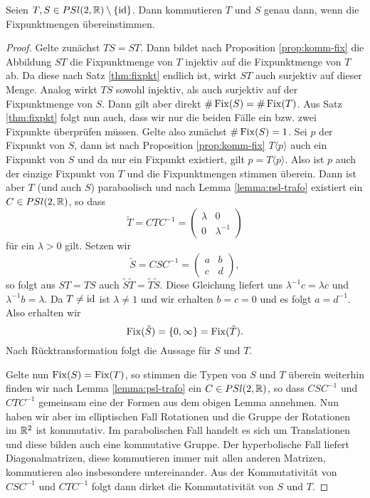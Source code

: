 \begin{thm}
  \label{thm:komm-fix}
  Seien $T,S \in PSl(2, \mathbb{R})\setminus \{\operatorname{id}\}$. Dann kommutieren $T$ und $S$ genau dann,
  wenn die Fixpunktmengen übereinstimmen.
\end{thm}

\begin{proof}
  Gelte zunächst $TS = ST$. Dann bildet nach Proposition
  \ref{prop:komm-fix} die Abbildung $ST$ die Fixpunktmenge von $T$
  injektiv auf die Fixpunktmenge von $T$ ab. Da diese nach Satz
  \ref{thm:fixpkt} endlich ist, wirkt $ST$ auch surjektiv auf dieser
  Menge. Analog wirkt $TS$ sowohl injektiv, als auch surjektiv auf der
  Fixpunktmenge von $S$. Dann gilt aber direkt $\# \operatorname{Fix}(S) = \#
  \operatorname{Fix}(T)$. Aus Satz \ref{thm:fixpkt} folgt nun auch, dass wir nur die
  beiden Fälle ein bzw. zwei Fixpunkte überprüfen müssen. Gelte also
  zunächst $\# \operatorname{Fix}(S) = 1$. Sei $p$ der Fixpunkt von $S$, dann ist
  nach Proposition \ref{prop:komm-fix} $T\langle p \rangle$ auch ein
  Fixpunkt von $S$ und da nur ein Fixpunkt existiert, gilt $ p = T
  \langle p \rangle$. Also ist $p$ auch der einzige Fixpunkt von $T$
  und die Fixpunktmengen stimmen überein. Dann ist aber $T$ (und auch
  $S$) parabaolisch und nach Lemma \ref{lemma:psl-trafo} existiert ein
  $C \in PSl(2,\mathbb{R})$, so dass
  \[
  \tilde T = C T C^{-1} =
  \begin{pmatrix}
    \lambda & 0 \\
    0 & \lambda^{-1}
  \end{pmatrix}
  \]
  für ein $\lambda > 0$ gilt. Setzen wir
  \[
  \tilde S = C S C^{-1} =
  \begin{pmatrix}
    a & b \\
    c & d
  \end{pmatrix},
  \]
  so folgt aus $ST = TS$ auch $\tilde S \tilde T = \tilde T \tilde
  S$. Diese Gleichung liefert uns $\lambda^{-1} c = \lambda c$ und
  $\lambda^{-1} b = \lambda$. Da $T \neq \operatorname{id}$ ist $\lambda \neq 1$ und
  wir erhalten $b = c = 0$ und es folgt $a = d^{-1}$. Also
  erhalten wir
  \[
  \operatorname{Fix}(\tilde S) = \{0, \infty\} = \operatorname{Fix}(\tilde T).
  \]
  Nach Rücktransformation folgt die Aussage für $S$ und $T$.

  Gelte nun $\operatorname{Fix}(S) = \operatorname{Fix}(T)$, so stimmen die Typen von $S$ und $T$
  überein weiterhin finden wir nach Lemma \ref{lemma:psl-trafo} ein $C
  \in PSl(2, \mathbb{R})$, so dass $C S C^{-1}$ und $C T C^{-1}$ gemeinsam
  eine der Formen aus dem obigen Lemma annehmen. Nun haben wir aber im
  elliptischen Fall Rotationen und die Gruppe der Rotationen im $\mathbb{R}^2$
  ist kommutativ. Im parabolischen Fall handelt es sich um
  Translationen und diese bilden auch eine kommutative Gruppe. Der
  hyperbolische Fall liefert Diagonalmatrizen, diese kommutieren immer
  mit allen anderen Matrizen, kommutieren also insbesondere
  untereinander. Aus der Kommutativität von $C S C^{-1}$ und $C T
  C^{-1}$ folgt dann dirket die Kommutativität von $S$ und $T$.
\end{proof}

